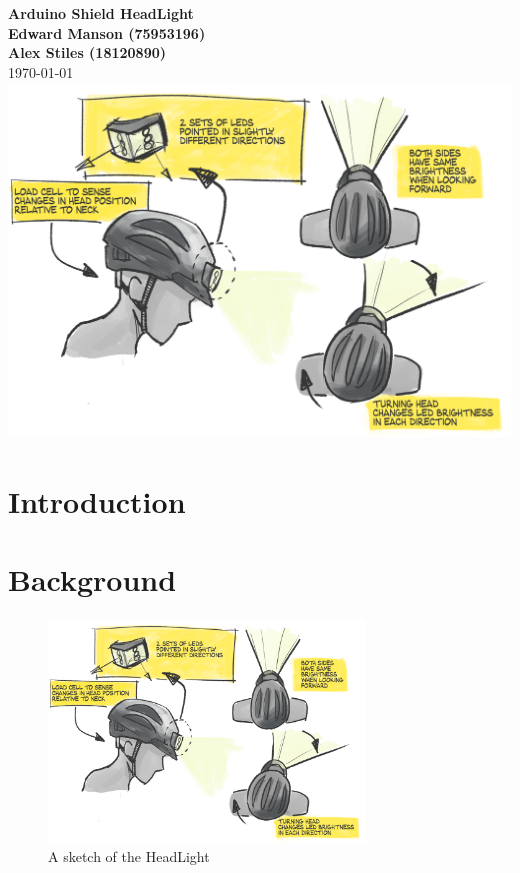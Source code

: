 \documentclass[twoside]{article}
\begin{document}

\begin{titlingpage}
    {\centering
    \vspace*{3cm}
    {\LARGE\textbf{Arduino Shield HeadLight}\\}
    \vspace{1cm}
    {\textbf{Edward Manson (75953196)}\\}
    {\textbf{Alex Stiles (18120890)}\\}
    \vspace{1cm}
    {\today}
    \vfill
    \noindent
    \includegraphics[width=0.75\linewidth]{headlamp-project-concept.png}
    \vfill}
\end{titlingpage}


{\hypersetup{linkcolor=black}
\tableofcontents
\listoffigures
\listoftables
\lstlistoflistings}
\newpage


\section{Introduction}

\section{Background}
    \noindent
    \begin{figure}[H]
        \centering
        \includegraphics[width=0.75\textwidth]{headlamp-project-concept.png}
        \caption{A sketch of the HeadLight}
        \label{fig:sketch}
    \end{figure}
\end{document}
